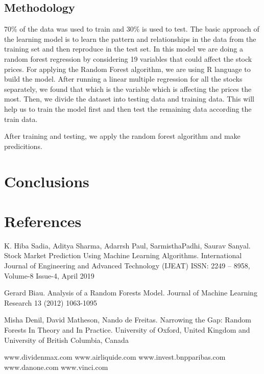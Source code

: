 \documentclass[
  11pt,
]{article}
\begin{document}
\hypertarget{methodology}{%
\subsection{Methodology}\label{methodology}}

70\% of the data was used to train and 30\% is used to test. The basic
approach of the learning model is to learn the pattern and relationships
in the data from the training set and then reproduce in the test set. In
this model we are doing a random forest regression by considering 19
variables that could affect the stock prices. For applying the Random
Forest algorithm, we are using R language to build the model. After
running a linear multiple regression for all the stocks separately, we
found that which is the variable which is affecting the prices the most.
Then, we divide the dataset into testing data and training data. This
will help us to train the model first and then test the remaining data
according the train data.

After training and testing, we apply the random forest algorithm and
make predicitions.

\hypertarget{conclusions}{%
\section{Conclusions}\label{conclusions}}

\newpage

\hypertarget{references}{%
\section{References}\label{references}}

K. Hiba Sadia, Aditya Sharma, Adarrsh Paul, SarmisthaPadhi, Saurav
Sanyal. Stock Market Prediction Using Machine Learning Algorithms.
International Journal of Engineering and Advanced Technology (IJEAT)
ISSN: 2249 -- 8958, Volume-8 Issue-4, April 2019

Gerard Biau. Analysis of a Random Forests Model. Journal of Machine
Learning Research 13 (2012) 1063-1095

Misha Denil, David Matheson, Nando de Freitas. Narrowing the Gap: Random
Forests In Theory and In Practice. University of Oxford, United Kingdom
and University of British Columbia, Canada

www.dividenmax.com www.airliquide.com www.invest.bnpparibas.com
www.danone.com www.vinci.com

  
\end{document}
